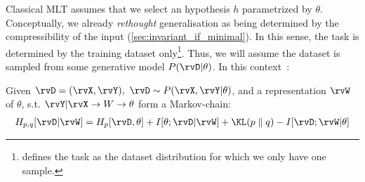 Classical \ac{MLT} assumes that we select an hypothesis $h$ parametrized by $\theta$. Conceptually, we already \emph{rethought} generalisation as being determined by the compressibility of the input (\cref{sec:invariant_if_minimal}). In this sense, the task is determined by the training dataset only\footnote{\cite{achille:2019phd} defines the task as the dataset distribution for which we only have one sample.}. Thus, we will assume the dataset is sampled from some generative model $P(\rvD|\theta)$. In this context~\cite{achille:2017emergence}:
\begin{theorem}
  Given $\rvD=(\rvX,\rvY),~ \rvD \sim P(\rvX, \rvY| \theta)$, and a representation $\rvW$ of $\theta$, s.t. $\rvY|\rvX \to W \to \theta$ form a Markov-chain:
  \begin{align*}
    H_{p,q}[\rvD|\rvW]=H_p[\rvD,\theta] + I[\theta;\rvD|\rvW] +
    \KL(p \parallel q)-I[\rvD;\rvW|\theta]
  \end{align*}
\end{theorem}
